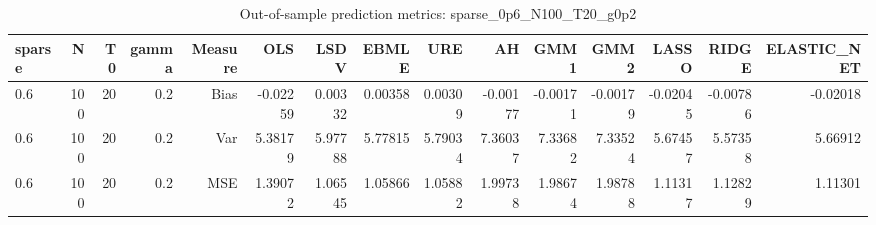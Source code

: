\begin{table}[!htbp]\centering
\caption{Out-of-sample prediction metrics: sparse_0p6_N100_T20_g0p2}
\label{tab:table3_sparse_0p6_N100_T20_g0p2}
\begin{tabular}{lrrrrrrrrrrrrrr}
\hline
sparse & N & T0 & gamma & Measure & OLS & LSDV & EBMLE & URE & AH & GMM1 & GMM2 & LASSO & RIDGE & ELASTIC_NET \\
\hline
0.6 & 100 & 20 & 0.2 & Bias & -0.02259 & 0.00332 & 0.00358 & 0.00309 & -0.00177 & -0.00171 & -0.00179 & -0.02045 & -0.00786 & -0.02018 \\
0.6 & 100 & 20 & 0.2 & Var & 5.38179 & 5.97788 & 5.77815 & 5.79034 & 7.36037 & 7.33682 & 7.33524 & 5.67457 & 5.57358 & 5.66912 \\
0.6 & 100 & 20 & 0.2 & MSE & 1.39072 & 1.06545 & 1.05866 & 1.05882 & 1.99738 & 1.98674 & 1.98788 & 1.11317 & 1.12829 & 1.11301 \\
\hline
\end{tabular}
\end{table}

